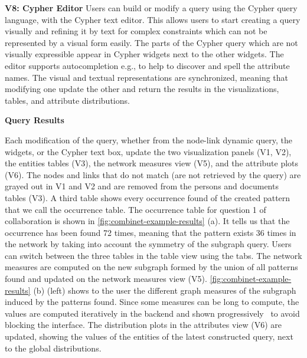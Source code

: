 \noindent\textbf{V8: Cypher Editor}
Users can build or modify a query using the Cypher query language, with the Cypher text editor.
This allows users to start creating a query visually and refining it by text for complex constraints which can not be represented by a visual form easily.
The parts of the Cypher query which are not visually expressible appear in Cypher widgets next to the other widgets.
The editor supports autocompletion e.g., to help to discover and spell the attribute names.
The visual and textual representations are synchronized, meaning that modifying one update the other and return the results in the visualizations, tables, and attribute distributions.


\noindent\textbf{Query Results}

Each modification of the query, whether from the node-link dynamic query, the widgets, or the Cypher text box, update the two visualization panels (V1, V2), the entities tables (V3), the network measures view (V5), and the attribute plots (V6).
The nodes and links that do not match (are not retrieved by the query) are grayed out in V1 and V2 and are removed from the persons and documents tables (V3).
A third table shows every occurrence found of the created pattern that we call the occurrence table.
The occurrence table for question 1 of collaboration \pascal is shown in \autoref{fig:combinet-example-results} (a).
It tells us that the occurrence has been found 72 times, meaning that the pattern exists 36 times in the network by taking into account the symmetry of the subgraph query.
Users can switch between the three tables in the table view using the tabs.
The network measures are computed on the new subgraph formed by the union of all patterns found and updated on the network measures view (V5).
\autoref{fig:combinet-example-results} (b) (left) shows to the user the different graph measures of the subgraph induced by the patterns found.
Since some measures can be long to compute, the values are computed iteratively in the backend and shown progressively~\cite{feketeProgressiveDataAnalysis2019} to avoid blocking the interface.
The distribution plots in the attributes view (V6) are updated, showing the values of the entities of the latest constructed query, next to the global distributions.



